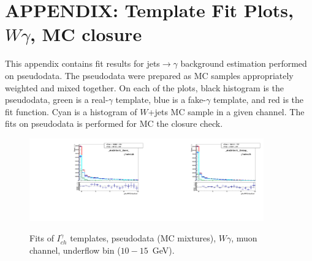 \section{APPENDIX: Template Fit Plots, $W\gamma$, MC closure}
\label{sec:TemplateFitPlotsMCclosure}

This appendix contains fit results for jets$\rightarrow \gamma$ background estimation performed on pseudodata. The pseudodata were prepared as MC samples appropriately weighted and mixed together. On each of the plots, black histogram is the pseudodata, green is a real-$\gamma$ template, blue is a fake-$\gamma$ template, and red is the fit function. Cyan is a histogram of $W$+jets MC sample in a given channel. The fits on pseudodata is performed for MC the closure check. 


  

\begin{figure}[htb]
  \begin{center}
   \includegraphics[width=0.45\textwidth]{../figs/figs_v11/MUON_WGamma/TemplateFits/c_TEMPL_CHISO_UNblind__phoEt10to15__Barrel__RooFit_MCclosure.pdf}\includegraphics[width=0.45\textwidth]{../figs/figs_v11/MUON_WGamma/TemplateFits/c_TEMPL_CHISO_UNblind__phoEt10to15__Endcap__RooFit_MCclosure.pdf}\\
  \label{fig:templateFits_MCclosure_CHISO_MUON_0}
  \caption{Fits of $I_{ch}^{\gamma}$ templates, pseudodata (MC mixtures), $W\gamma$, muon channel, underflow bin ($10-15$~GeV).}
  \end{center}
\end{figure}

